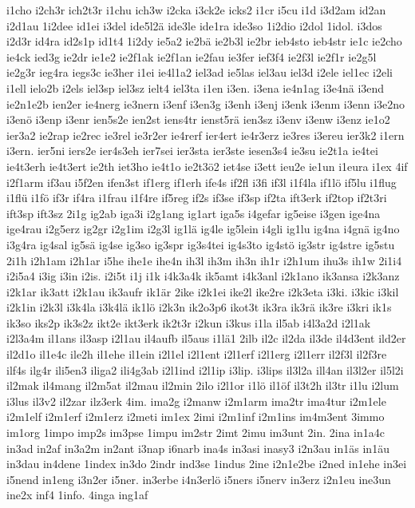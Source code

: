 {i1cho
i2ch3r
ich2t3r
i1chu
ich3w
i2cka
i3ck2e
icks2
i1cr
i5cu
i1d
i3d2am
id2an
i2d1au
1i2dee
id1ei
i3del
ide5l2ä
ide3le
ide1ra
ide3so
1i2dio
i2dol
1idol.
i3dos
i2d3r
id4ra
id2s1p
id1t4
1i2dy
ie5a2
ie2bä
ie2b3l
ie2br
ieb4sto
ieb4str
ie1c
ie2cho
ie4ck
ied3g
ie2dr
ie1e2
ie2f1ak
ie2f1an
ie2fau
ie3fer
ief3f4
ie2f3l
ie2f1r
ie2g5l
ie2g3r
ieg4ra
iegs3c
ie3her
i1ei
ie4l1a2
iel3ad
ie5las
iel3au
iel3d
i2ele
iel1ec
i2eli
i1ell
ielo2b
i2els
iel3sp
iel3sz
ielt4
iel3ta
i1en
i3en.
i3ena
ie4n1ag
i3e4nä
i3end
ie2n1e2b
ien2er
ie4nerg
ie3nern
i3enf
i3en3g
i3enh
i3enj
i3enk
i3enm
i3enn
i3e2no
i3enö
i3enp
i3enr
ien5s2e
ien2st
iens4tr
ienst5rä
ien3sz
i3env
i3enw
i3enz
ie1o2
ier3a2
ie2rap
ie2rec
ie3rel
ie3r2er
ie4rerf
ier4ert
ie4r3erz
ie3res
i3ereu
ier3k2
i1ern
i3ern.
ier5ni
iers2e
ier4s3eh
ier7sei
ier3sta
ier3ste
iesen3s4
ie3su
ie2t1a
ie4tei
ie4t3erh
ie4t3ert
ie2th
iet3ho
ie4t1o
ie2t3ö2
iet4se
i3ett
ieu2e
ie1un
i1eura
i1ex
4if
i2f1arm
if3au
i5f2en
ifen3st
if1erg
if1erh
ife4s
if2fl
i3fi
if3l
i1f4la
if1lö
if5lu
i1flug
i1flü
i1fö
if3r
if4ra
i1frau
i1f4re
if5reg
if2s
if3se
if3sp
if2ta
ift3erk
if2top
if2t3ri
ift3sp
ift3sz
2i1g
ig2ab
iga3i
i2g1ang
ig1art
iga5s
i4gefar
ig5eise
i3gen
ige4na
ige4rau
i2g5erz
ig2gr
i2g1im
i2g3l
ig1lä
ig4le
ig5lein
i4gli
ig1lu
ig4na
i4gnä
ig4no
i3g4ra
ig4sal
ig5sä
ig4se
ig3so
ig3spr
ig3s4tei
ig4s3to
ig4stö
ig3str
ig4stre
ig5stu
2i1h
i2h1am
i2h1ar
i5he
ihe1e
ihe4n
ih3l
ih3m
ih3n
ih1r
i2h1um
ihu3s
ih1w
2i1i4
i2i5a4
i3ig
i3in
i2is.
i2i5t
i1j
i1k
i4k3a4k
ik5amt
i4k3anl
i2k1ano
ik3ansa
i2k3anz
i2k1ar
ik3att
i2k1au
ik3aufr
ik1är
2ike
i2k1ei
ike2l
ike2re
i2k3eta
i3ki.
i3kic
i3kil
i2k1in
i2k3l
i3k4la
i3k4lä
ik1lö
i2k3n
ik2o3p6
ikot3t
ik3ra
ik3rä
ik3re
i3kri
ik1s
ik3so
iks2p
ik3s2z
ikt2e
ikt3erk
ik2t3r
i2kun
i3kus
i1la
il5ab
i4l3a2d
i2l1ak
i2l3a4m
il1ans
il3asp
i2l1au
il4aufb
il5aus
i1lä1
2ilb
il2c
il2da
il3de
il4d3ent
ild2er
il2d1o
il1e4c
ile2h
il1ehe
il1ein
i2l1el
i2l1ent
i2l1erf
i2l1erg
i2l1err
il2f3l
il2f3re
ilf4s
ilg4r
ili5en3
iliga2
ili4g3ab
i2l1ind
i2l1ip
i3lip.
i3lips
il3l2a
ill4an
il3l2er
il5l2i
il2mak
il4mang
il2m5at
il2mau
il2min
2ilo
i2l1or
i1lö
il1öf
il3t2h
il3tr
i1lu
i2lum
i3lus
il3v2
il2zar
ilz3erk
4im.
ima2g
i2manw
i2m1arm
ima2tr
ima4tur
i2m1ele
i2m1elf
i2m1erf
i2m1erz
i2meti
im1ex
2imi
i2m1inf
i2m1ins
im4m3ent
3immo
im1org
1impo
imp2s
im3pse
1impu
im2str
2imt
2imu
im3unt
2in.
2ina
in1a4c
in3ad
in2af
in3a2m
in2ant
i3nap
i6narb
ina4s
in3asi
inasy3
i2n3au
in1äs
in1äu
in3dau
in4dene
1index
in3do
2indr
ind3se
1indus
2ine
i2n1e2be
i2ned
in1ehe
in3ei
i5nend
in1eng
i3n2er
i5ner.
in3erbe
i4n3erlö
i5ners
i5nerv
in3erz
i2n1eu
ine3un
ine2x
inf4
1info.
4inga
ing1af
}
